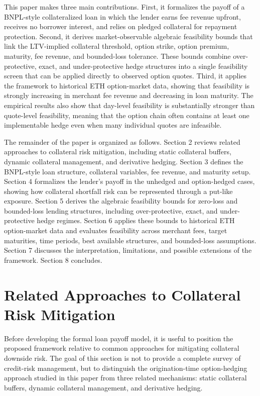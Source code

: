 \documentclass[11pt]{article}
\begin{document}
This paper makes three main contributions. First, it formalizes the payoff of a BNPL-style collateralized loan in which the lender earns fee revenue upfront, receives no borrower interest, and relies on pledged collateral for repayment protection. Second, it derives market-observable algebraic feasibility bounds that link the LTV-implied collateral threshold, option strike, option premium, maturity, fee revenue, and bounded-loss tolerance. These bounds combine over-protective, exact, and under-protective hedge structures into a single feasibility screen that can be applied directly to observed option quotes. Third, it applies the framework to historical ETH option-market data, showing that feasibility is strongly increasing in merchant fee revenue and decreasing in loan maturity. The empirical results also show that day-level feasibility is substantially stronger than quote-level feasibility, meaning that the option chain often contains at least one implementable hedge even when many individual quotes are infeasible.

The remainder of the paper is organized as follows. Section 2 reviews related approaches to collateral risk mitigation, including static collateral buffers, dynamic collateral management, and derivative hedging. Section 3 defines the BNPL-style loan structure, collateral variables, fee revenue, and maturity setup. Section 4 formalizes the lender’s payoff in the unhedged and option-hedged cases, showing how collateral shortfall risk can be represented through a put-like exposure. Section 5 derives the algebraic feasibility bounds for zero-loss and bounded-loss lending structures, including over-protective, exact, and under-protective hedge regimes. Section 6 applies these bounds to historical ETH option-market data and evaluates feasibility across merchant fees, target maturities, time periods, best available structures, and bounded-loss assumptions. Section 7 discusses the interpretation, limitations, and possible extensions of the framework. Section 8 concludes.

\section{Related Approaches to Collateral Risk Mitigation}
Before developing the formal loan payoff model, it is useful to position the proposed framework relative to common approaches for mitigating collateral downside risk. The goal of this section is not to provide a complete survey of credit-risk management, but to distinguish the origination-time option-hedging approach studied in this paper from three related mechanisms: static collateral buffers, dynamic collateral management, and derivative hedging.
\end{document}

